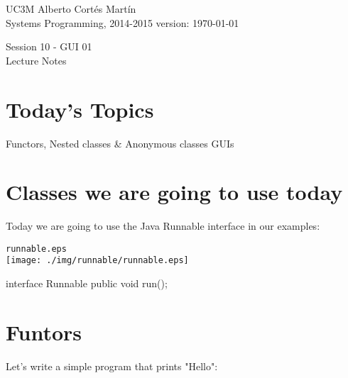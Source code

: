 \documentclass[a4paper, 9pt]{extarticle}
\newcommand{\realtitle}{Session 10 - GUI 01}
\begin{document}
\makebox[\linewidth]{\rule{\textwidth}{0.4pt}}
UC3M \hfill Alberto Cortés Martín\\
Systems Programming, 2014-2015 \hfill version: \today\\
\makebox[\linewidth]{\rule{\textwidth}{0.4pt}}
\begin{center}
  \Large{\realtitle}\\Lecture Notes
\end{center}
\makebox[\linewidth]{\rule{\textwidth}{0.4pt}}
\vspace{1cm}


\section{Today's Topics}
\begin{blackboard}
Functors, Nested classes & Anonymous classes
GUIs
\end{blackboard}







\section{Classes we are going to use today}

Today we are going to use the Java Runnable interface in our examples:

\begin{multicols}{2}
  \begin{center}
    \verb+runnable.eps+\\
    \texttt{[image: ./img/runnable/runnable.eps]}
  \end{center}
  \columnbreak
  \begin{blackboard}
interface Runnable {
    public void run();
}
\end{blackboard}
\end{multicols}
















\section{Funtors}


Let's write a simple program that prints "Hello":
\end{document}
